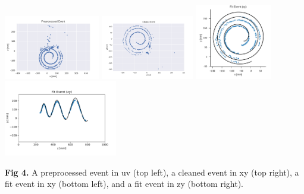 \documentclass[ansiepaperDNP,portrait]{baposterDNP}
\begin{document}
\begin{poster}
{{\begin{center}
\includegraphics [height=28mm] {preprocess_evt.pdf}
\hspace{0cm}
\includegraphics [height=28mm] {clean_evtDNP.pdf}
\hspace{3cm}
\includegraphics [height=33mm] {fit_evt_xyDNP.pdf}
\hspace{0cm}
\includegraphics [height=33mm] {fit_evt_zyDNP.pdf}
\end{center}
\vspace{-1em}
\textbf{Fig 4.} A preprocessed event in uv (top left), a cleaned event in xy (top right), a fit event in xy (bottom left), and a fit event in zy (bottom right).}
} 

\end{poster}
\end{document}
